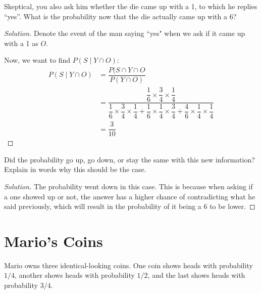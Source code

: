 \documentclass{article}
\newenvironment{solution}{\begin{proof}[Solution]}{\end{proof}}
\begin{document}
\begin{hw}
	Skeptical, you also ask him whether the die came up with a 1, to which he replies ``yes''. What is the probability now that the die actually came up with a $6$?
\end{hw}
\begin{solution}
	Denote the event of the man saying ``yes" when we ask if it came up with a 1 as $O$.
	
	Now, we want to find $P(S \mid Y \cap O)$:
	\begin{align*}
		P(S \mid Y \cap O) &= \dfrac{P(S \cap Y \cap O}{P(Y \cap O)} \\
		&= \dfrac{\dfrac{1}{6} \times \dfrac{3}{4} \times \dfrac{1}{4}}{\dfrac{1}{6} \times \dfrac{3}{4} \times \dfrac{1}{4} + \dfrac{1}{6} \times \dfrac{1}{4} \times \dfrac{3}{4} + \dfrac{4}{6} \times \dfrac{1}{4} \times \dfrac{1}{4}} \\
		&= \dfrac{3}{10}
	\end{align*}
\end{solution}

\begin{hw}
	Did the probability go up, go down, or stay the same with this new information? Explain in words why this should be the case.
\end{hw}
\begin{solution}
	The probability went down in this case. This is because when asking if a one showed up or not, the answer has a higher chance of contradicting what he said previously, which will result in the probability of it being a 6 to be lower.
\end{solution}

\newpage

\section{Mario's Coins}
Mario owns three identical-looking coins. One coin shows heads with probability
$1/4$, another shows heads with probability $1/2$, and the last shows heads 
with probability $3/4$.
\end{document}
